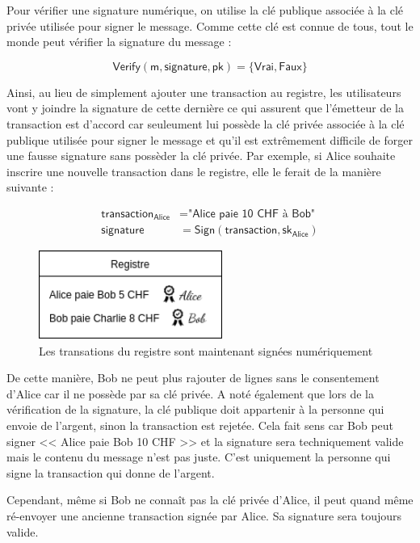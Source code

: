 Pour vérifier une signature numérique, on utilise la clé publique associée à la clé privée utilisée pour signer le message. Comme cette clé est connue de tous, tout le monde peut vérifier la signature du message :

\begin{equation*}
  \mathsf{Verify(m, signature, pk)} = \{\mathsf{Vrai}, \mathsf{Faux}\}
\end{equation*}

Ainsi, au lieu de simplement ajouter une transaction au registre, les utilisateurs vont y joindre la signature de cette dernière ce qui assurent que l'émetteur de la transaction est d'accord car seuleument lui possède la clé privée associée à la clé publique utilisée pour signer le message et qu'il est extrêmement difficile de forger une fausse signature sans possèder la clé privée. Par exemple, si Alice souhaite inscrire une nouvelle transaction dans le registre, elle le ferait de la manière suivante :

\begin{align*}
  \mathsf{transaction_{Alice}} &= \textsf{"Alice paie 10 CHF à Bob"}\\
  \mathsf{signature} &= \mathsf{Sign(transaction, sk_{Alice})}
\end{align*}

\begin{figure}[H]
  \centering
  \includegraphics[width=6cm]{images/crypto_3.png}
  \caption{Les transations du registre sont maintenant signées numériquement}
\end{figure}

De cette manière, Bob ne peut plus rajouter de lignes sans le consentement d'Alice car il ne possède par sa clé privée. A noté également que lors de la vérification de la signature, la clé publique doit appartenir à la personne qui envoie de l'argent, sinon la transaction est rejetée. Cela fait sens car Bob peut signer << Alice paie Bob 10 CHF >> et la signature sera techniquement valide mais le contenu du message n'est pas juste. C'est uniquement la personne qui signe la transaction qui donne de l'argent. 

Cependant, même si Bob ne connaît pas la clé privée d'Alice, il peut quand même ré-envoyer une ancienne transaction signée par Alice. Sa signature sera toujours valide.


